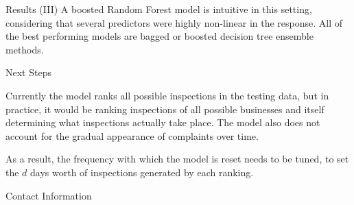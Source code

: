 \documentclass[final]{beamer}
\newlength{\onecolwid}
\begin{document}
\begin{frame}[t]
\begin{columns}[t]
\begin{column}{\onecolwid}
\begin{block}{Results (III)}
A boosted Random Forest model is intuitive in this
setting, considering that several predictors were
highly non-linear in the response. All 
of the best performing models are bagged or 
boosted decision tree ensemble methods. 

\end{block}

\vspace{-1in.}
\begin{block}{Next Steps}

Currently the model ranks all possible inspections
in the testing data, but in practice,
it would be ranking inspections of all possible
businesses and itself determining what inspections
actually take place. The model also does not account for the 
gradual appearance of complaints over time. \\ 

\vspace{.4in}

As a result, the frequency with which the model
is reset needs to be tuned, to set the $d$ days
worth of inspections generated by each ranking.
\end{block}









\begin{alertblock}{Contact Information}


\end{alertblock}
\end{column}
\end{columns}
\end{frame}
\end{document}
